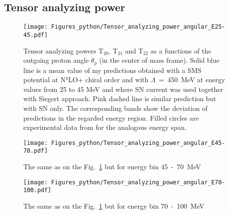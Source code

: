     \subsection{Tensor analyzing power}

      

    \begin{figure}[h]
        \begin{center}
        \texttt{[image: Figures\_python/Tensor\_analyzing\_power\_angular\_E25-45.pdf]}
        \end{center}
        \caption{Tensor analyzing powers T$_{20}$, T$_{21}$ and T$_{22}$ as a functions of the
        outgoing proton angle $\theta_p$ (in the center of mass frame).
        Solid blue line is a mean value of my predictions obtained with a
        SMS potential at N$^4$LO+ chiral order and with $\Lambda$~=~450~MeV
        at energy values from 25 to 45 MeV and
        where SN current was used together with Siegert approach. 
        Pink dashed line is similar prediction but with SN only. 
        The corresponding bands show the deviation of predictions in the regarded
        energy region.
        Filled circles are experimental data
        from \cite{rachek2007} for the analogous energy span.}
        \label{tensor_angular_25-45}
    \end{figure}

    \begin{figure}[h]
        \begin{center}
        \texttt{[image: Figures\_python/Tensor\_analyzing\_power\_angular\_E45-70.pdf]}
        \end{center}
        \caption{The same as on the Fig.~\ref*{tensor_angular_25-45} but for energy bin 45~-~70~MeV}
        \label{tensor_angular_45-70}
    \end{figure}

    \begin{figure}[h]
        \begin{center}
        \texttt{[image: Figures\_python/Tensor\_analyzing\_power\_angular\_E70-100.pdf]}
        \end{center}
        \caption{The same as on the Fig.~\ref*{tensor_angular_25-45} but for energy bin 70~-~100~MeV}
        \label{tensor_angular_70-100}
    \end{figure}        

